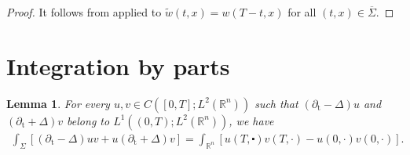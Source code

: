 \documentclass[10pt,a4paper]{amsart}
\newtheorem{lemma}[proposition]{Lemma}
\newcommand{\tm}{\mathrm{t}}
\begin{document}
\begin{proof}
It follows from  applied to $\tilde w (t, x) = w (T-t, x) $ for all
$(t, x) \in \overline{\Sigma}$.
\end{proof}






\appendix 

\section{Integration by parts}\label{app:integration-parts}
\begin{lemma}\label{L_A.1}\sl
For every $u, v \in C([0, T] ; L^2(\mathbb{R}^n))$ such that $( \partial_\tm-\Delta) u$ and $(\partial_\tm+\Delta) v$ belong to $L^1((0, T) ; L^2(\mathbb{R}^n))$, we have
\begin{align*}
  \int_{\Sigma}\left[( \partial_{\mathrm{t}}-\Delta) u v + u (\partial_{\mathrm{t}}+\Delta) v \right]= \int_{\mathbb{R}^n}\left[u(T, \centerdot) v(T, \cdot)-u(0, \cdot) v(0, \cdot)\right] .  
\end{align*}
\end{lemma}
\end{document}
